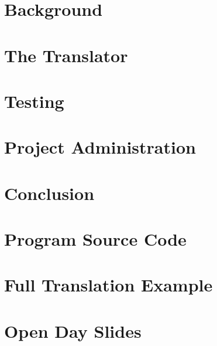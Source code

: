 \documentclass[a4paper,12pt,twoside,openright]{report}
\begin{document}
%
%



\tableofcontents


%
%

\chapter{Background}
\label{sec:background}


\chapter{The Translator}
\label{sec:translator}


\chapter{Testing}
\label{sec:testing}


\chapter{Project Administration}
\label{sec:projadmin}


\chapter{Conclusion}
\label{sec:conclusion}



%
%

\appendix

\chapter{Program Source Code}


\chapter{Full Translation Example}


\chapter{Open Day Slides}
\label{sec:openday}



%
%


\end{document}
